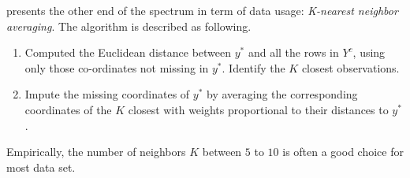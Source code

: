 \cite{troyanskaya2001missing} presents the other end of the spectrum in term of
data usage: \emph{K-nearest neighbor averaging}. The algorithm is described as
following.
\begin{enumerate}
  \item Computed the Euclidean distance between $y^*$ and all the rows in $Y^c$,
    using only those co-ordinates not missing in $y^*$. Identify the $K$ closest
    observations.
  \item Impute the missing coordinates of $y^*$ by averaging the corresponding
    coordinates of the $K$ closest with weights proportional to their distances
    to $y^*$.
\end{enumerate}

Empirically, the number of neighbors $K$ between $5$ to $10$ is often a good
choice for most data set.

